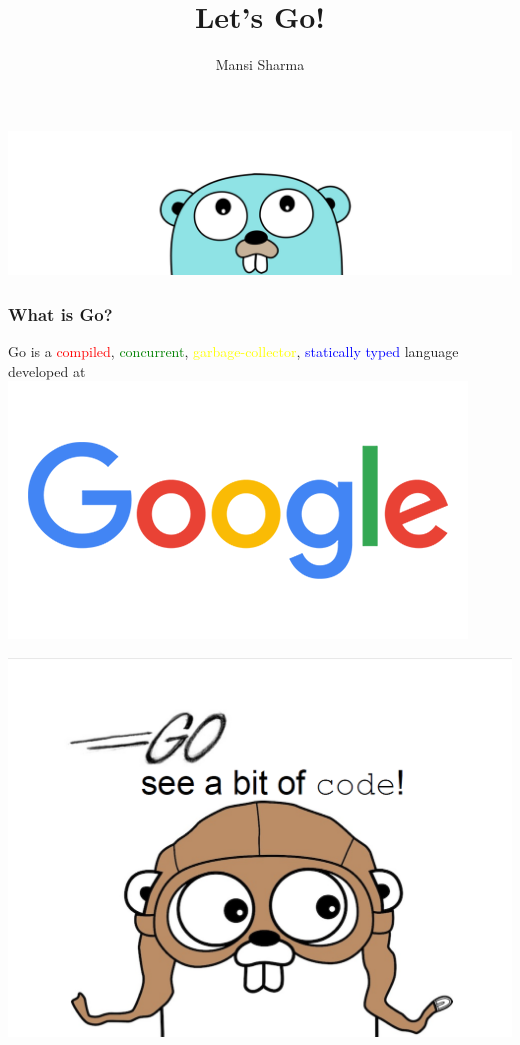 \documentclass[14pt]{beamer}
\title[A Tour of Go]{\huge Let's Go!}
\author{Mansi Sharma}
\begin{document}
{
\begin{frame}
    \titlepage
    \includegraphics[width=\linewidth]{img/golang.png}
\end{frame}
}

{
\begin{frame}
    \frametitle {What is Go?}
    \begin{center}
    \textcolor{deepblue}{Go is a \textcolor{red}{compiled}, \textcolor{green}{concurrent}, \textcolor{yellow}{garbage-collector}, \textcolor{blue}{statically typed} language developed at}
    \linebreak
    \includegraphics[width=0.3\linewidth]{img/google.png}
    \end{center}
\end{frame}
}

{
\begin{frame}
    \includegraphics[width=\linewidth]{img/golang.PNG}
\end{frame}
}
\end{document}

